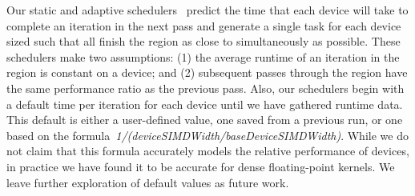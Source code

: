 Our static and adaptive schedulers~\cite{Scogland:2012br,
  scogland:7Hpt64iV} predict the time that each device will take to
complete an iteration in the next pass and generate a single task for
each device sized such that all finish the region as close to
simultaneously as possible.  These schedulers make two assumptions:
(1) the average runtime of an iteration in the region is constant on a
device; and (2) subsequent passes through the region have the same
performance ratio as the previous pass. Also, our schedulers begin
with a default time per iteration for each device until we have
gathered runtime data. This default is either a user-defined value,
one saved from a previous run, or one based on the
formula~\emph{1/(deviceSIMDWidth/baseDeviceSIMDWidth)}.  While we do not
claim that this formula accurately models the relative performance of
devices, in practice we have found it to be accurate for dense
floating-point kernels. We leave further exploration of default values
as future work.

